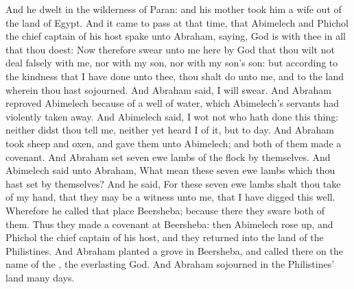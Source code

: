 \begin{biblechapter}
\verse And he dwelt in the wilderness of Paran: and his mother took him a wife out of the land of Egypt.
 And it came to pass at that time, that Abimelech and Phichol the chief captain of his host spake unto Abraham, saying, God is with thee in all that thou doest:
\verse Now therefore swear unto me here by God that thou wilt not deal falsely with me, nor with my son, nor with my son's son: but according to the kindness that I have done unto thee, thou shalt do unto me, and to the land wherein thou hast sojourned.
\verse And Abraham said, I will swear.
\verse And Abraham reproved Abimelech because of a well of water, which Abimelech's servants had violently taken away.
\verse And Abimelech said, I wot not who hath done this thing: neither didst thou tell me, neither yet heard I of it, but to day.
\verse And Abraham took sheep and oxen, and gave them unto Abimelech; and both of them made a covenant.
\verse And Abraham set seven ewe lambs of the flock by themselves.
\verse And Abimelech said unto Abraham, What mean these seven ewe lambs which thou hast set by themselves?
\verse And he said, For these seven ewe lambs shalt thou take of my hand, that they may be a witness unto me, that I have digged this well.
\verse Wherefore he called that place Beersheba; because there they sware both of them.
\verse Thus they made a covenant at Beersheba: then Abimelech rose up, and Phichol the chief captain of his host, and they returned into the land of the Philistines.
\verse And Abraham planted a grove in Beersheba, and called there on the name of the \LORD, the everlasting God.
\verse And Abraham sojourned in the Philistines' land many days.
\end{biblechapter}

